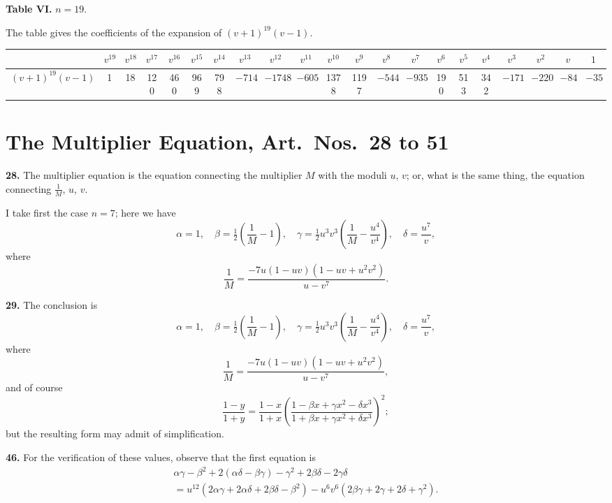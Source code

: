 \documentclass[12pt,a4paper]{article}
\begin{document}
\medskip

\noindent\textbf{Table VI.} $n = 19$.

\medskip

\noindent
The table gives the coefficients of the expansion of $(v+1)^{19}(v-1)$.

\begin{center}
\begin{tabular}{|c|c|c|c|c|c|c|c|c|c|c|c|c|c|c|c|c|c|c|c|c|}
\hline
& $v^{19}$ & $v^{18}$ & $v^{17}$ & $v^{16}$ & $v^{15}$ & $v^{14}$ & $v^{13}$ & $v^{12}$ & $v^{11}$ & $v^{10}$ & $v^9$ & $v^8$ & $v^7$ & $v^6$ & $v^5$ & $v^4$ & $v^3$ & $v^2$ & $v$ & $1$ \\
\hline
$(v+1)^{19}(v-1)$ & 1 & 18 & 120 & 460 & 969 & 798 & $-714$ & $-1748$ & $-605$ & 1378 & 1197 & $-544$ & $-935$ & 190 & 513 & 342 & $-171$ & $-220$ & $-84$ & $-35$ \\
\hline
\end{tabular}
\end{center}

\medskip




\section*{The Multiplier Equation, Art.~Nos.~28 to 51}

\textbf{28.} The multiplier equation is the equation connecting the multiplier $M$ with the moduli $u$, $v$; or, what is the same thing, the equation connecting $\frac{1}{M}$, $u$, $v$.

I take first the case $n = 7$; here we have
\[
\alpha = 1, \quad \beta = \tfrac{1}{2}\left(\frac{1}{M} - 1\right), \quad
\gamma = \tfrac{1}{2}u^3 v^3\left(\frac{1}{M} - \frac{u^4}{v^4}\right), \quad
\delta = \frac{u^7}{v},
\]
where
\[
\frac{1}{M} = \frac{-7u(1 - uv)(1 - uv + u^2 v^2)}{u - v^7}.
\]

\textbf{29.} The conclusion is
\[
\alpha = 1, \quad \beta = \tfrac{1}{2}\left(\frac{1}{M} - 1\right), \quad
\gamma = \tfrac{1}{2}u^3 v^3\left(\frac{1}{M} - \frac{u^4}{v^4}\right), \quad
\delta = \frac{u^7}{v},
\]
where
\[
\frac{1}{M} = \frac{-7u(1 - uv)(1 - uv + u^2 v^2)}{u - v^7},
\]
and of course
\[
\frac{1 - y}{1 + y} = \frac{1 - x}{1 + x}
\left(\frac{1 - \beta x + \gamma x^2 - \delta x^3}
{1 + \beta x + \gamma x^2 + \delta x^3}\right)^2;
\]
but the resulting form may admit of simplification.

\textbf{46.} For the verification of these values, observe that the first equation is
\begin{multline*}
\alpha\gamma - \beta^2 + 2(\alpha\delta - \beta\gamma) - \gamma^2 + 2\beta\delta - 2\gamma\delta \\
= u^{12}(2\alpha\gamma + 2\alpha\delta + 2\beta\delta - \beta^2) - u^6 v^6(2\beta\gamma + 2\gamma + 2\delta + \gamma^2).
\end{multline*}
\end{document}

